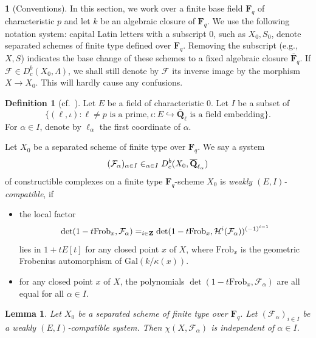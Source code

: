\documentclass[english]{smfart}
\let\prod\relax\DeclareMathSymbol{\prod}{\mathop}{fourier}{81}
\renewcommand{\mathbb}{\mathbf}
\theoremstyle{remark}
\theoremstyle{plain}
\newtheorem{lemma}[remark]{Lemma}
\theoremstyle{definition}
\newtheorem{definition}[remark]{Definition}
\numberwithin{equation}{remark}
\theoremstyle{void}
\newtheorem{situation}[remark]{}
\begin{document}
\begin{situation}[Conventions]
In this section, we work over a finite base field \(\mathbf{F}_q\) of characteristic \(p\) and
let \(k\) be an algebraic closure of \(\mathbb{F}_{q}\).  We use
the following notation system:
capital Latin letters with a subscript \(0\), such as
\(X_0, S_0\), denote separated schemes of finite type defined over
\(\mathbf{F}_q\).  Removing the subscript (e.g., \(X, S\)) indicates
the base change of these schemes to a fixed algebraic closure
\(\overline{\mathbf{F}}_q\).  If
\(\mathcal{F} \in D^{b}_{c}(X_{0},\Lambda)\), we shall still denote by
\(\mathcal{F}\) its inverse image by the morphism \(X \to X_{0}\).
This will hardly cause any confusions.
\end{situation}

\begin{definition}[cf.~\cite{fujiwara_gabber-independence-of-l-for-intersection-cohomology}]
Let \(E\) be a field of characteristic \(0\).
Let \(I\) be a subset of
\[
\{(\ell,\iota) : \ell \neq p \text{ is a prime}, \iota\colon E \hookrightarrow \overline{\mathbb{Q}}_{\ell} \text{ is a field embedding}\}.
\]
For \(\alpha \in I\), denote by \(\ell_{\alpha}\) the first coordinate
of \(\alpha\).

Let \(X_{0}\) be a separated scheme of finite type over
\(\mathbb{F}_{q}\).  We say a system
\[
(\mathcal{F}_{\alpha})_{\alpha\in I} \in \prod_{\alpha\in I}
D^{b}_{c}(X_{0},\overline{\mathbb{Q}}_{\ell_{\alpha}})
\]
of constructible complexes on a finite type \(\mathbb{F}_{q}\)-scheme
\(X_{0}\) is \emph{weakly \((E,I)\)-compatible}, if
\begin{itemize}
\item the local factor
\[
\det(1 - t\mathrm{Frob}_{x},\mathcal{F}_{\alpha}) =
\prod_{i\in \mathbb{Z}} \det(1 - t\mathrm{Frob}_{x},\mathcal{H}^{i}(\mathcal{F}_{\alpha}))^{(-1)^{i-1}}
\]
lies in \(1 + tE[t]\)
for any closed point \(x\) of \(X\), where \(\mathrm{Frob}_{x}\) is the geometric Frobenius automorphism of \(\mathrm{Gal}(k/\kappa(x))\).
\item for any closed point \(x\) of \(X\), the polynomials
\(\det(1 - t\mathrm{Frob}_{x},\mathcal{F}_{\alpha})\) are all equal
for all \(\alpha \in I\).
\end{itemize}
\end{definition}


\begin{lemma}\label{lemma:euler-characteristic-independent-of-l}
Let \(X_0\) be a separated scheme of finite type over
\(\mathbb{F}_{q}\).  Let \((\mathcal{F}_{\alpha})_{i\in I}\) be a
weakly \((E,I)\)-compatible system.  Then
\(\chi(X,\mathcal{F}_{\alpha})\) is independent of \(\alpha\in I\).
\end{lemma}
\end{document}
